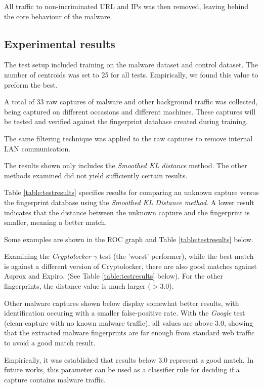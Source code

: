 \documentclass[13pt,journal,compsoc,onecolumn]{IEEEtran}
\begin{document}
All traffic to non-incriminated URL and IPs was then removed, leaving behind the core behaviour of the malware.

\subsection{Experimental results}

The test setup included training on the malware dataset and control dataset.
The number of centroids was set to 25 for all tests. Empirically, we found this value to preform the best.

A total of 33 raw captures of malware and other background traffic was collected, being captured on different occasions and different machines. These captures will be tested and verified against the fingerprint database created during training.

The same filtering technique was applied to the raw captures to remove internal LAN communication.

The results shown only includes the {\em Smoothed KL distance} method. The other methods examined did not yield sufficiently certain results.

Table \ref{table:testresults} specifies results for comparing an unknown capture versus the fingerprint database using the {\em Smoothed KL Distance method}.
A lower result indicates that the distance between the unknown capture and the fingerprint is smaller, meaning a better match.

Some examples are shown in the ROC graph and Table \ref{table:testresults} below.

Examining the \emph{Cryptolocker $\gamma$} test (the 'worst' performer), while the best match is against a different version of Cryptolocker, there are also good matches against Asprox and Expiro. (See Table \ref{table:testresults} below).
For the other fingerprints, the distance value is much larger ($>3.0$).

Other malware captures shown below display somewhat better results, with identification occuring with a smaller false-positive rate.
With the \emph{Google} test (clean capture with no known malware traffic), all values are above $3.0$, showing that the extracted malware fingerprints are far enough from standard web traffic to avoid a good match result.

Empirically, it was established that results below $3.0$ represent a good match. In future works, this parameter can be used as a classifier rule for deciding if a capture contains malware traffic.
\end{document}
